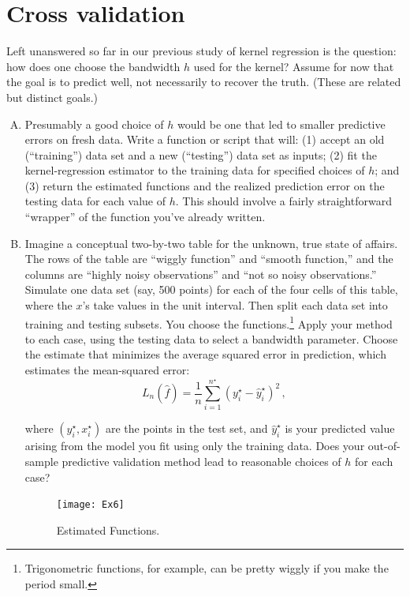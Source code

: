 \documentclass[11pt]{article}
\begin{document}
\section{Cross validation}

Left unanswered so far in our previous study of kernel regression is the question: how does one choose the bandwidth $h$ used for the kernel?  Assume for now that the goal is to predict well, not necessarily to recover the truth.  (These are related but distinct goals.)  

\begin{enumerate}[(A)]


\item  Presumably a good choice of $h$ would be one that led to smaller predictive errors on fresh data.  Write a function or script that will: (1) accept an old (``training'') data set and a new (``testing'') data set as inputs; (2) fit the kernel-regression estimator to the training data for specified choices of $h$; and (3) return the estimated functions and the realized prediction error on the testing data for each value of $h$.  This should involve a fairly straightforward ``wrapper'' of the function you've already written.

\item Imagine a conceptual two-by-two table for the unknown, true state of affairs.  The rows of the table are ``wiggly function'' and ``smooth function,'' and the columns are ``highly noisy observations'' and ``not so noisy observations.''  Simulate one data set (say, 500 points) for each of the four cells of this table, where the $x$'s take values in the unit interval.  Then split each data set into training and testing subsets.  You choose the functions.\footnote{Trigonometric functions, for example, can be pretty wiggly if you make the period small.}   Apply your method to each case, using the testing data to select a bandwidth parameter.  Choose the estimate that minimizes the average squared error in prediction, which estimates the mean-squared error:
$$
L_n(\hat{f}) = \frac{1}{n}\sum_{i=1}^{n^{\star}} (y^{\star}_i - \hat{y}_i^{\star} )^2 \, ,
$$

where $(y_i^{\star}, x_i^{\star})$ are the points in the test set, and $ \hat{y}_i^{\star}$ is your predicted value arising from the model you fit using only the training data.  Does your out-of-sample predictive validation method lead to reasonable choices of $h$ for each case?

\begin{figure}[h]
    \centering
    \texttt{[image: Ex6]}
    \caption{Estimated Functions.}
\end{figure}


\end{enumerate}
\end{document}
